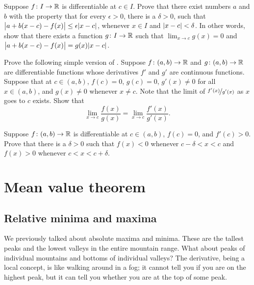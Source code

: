 \begin{exercise}
Suppose $f \colon I \to {\mathbb{R}}$ is differentiable at $c \in I$.
Prove that there exist numbers $a$ and $b$ with the property that
for every $\epsilon > 0$, there is a $\delta > 0$, such that
$\bigl\lvert {a+b(x-c) - f(x)} \bigr\rvert \leq \epsilon \lvert {x-c} \rvert$, whenever $x \in I$ and
$\lvert {x-c} \rvert < \delta$.
In other words, show that
there exists a function $g \colon I \to {\mathbb{R}}$
such that $\lim_{x\to c} g(x) = 0$ and
$\bigl\lvert {a+b(x-c) - f(x)} \bigr\rvert = g(x) \lvert {x-c} \rvert$.
\end{exercise}

\begin{exercise} \label{exercise:simpleLHopital}
Prove the following simple version of .
Suppose 
$f \colon (a,b) \to {\mathbb{R}}$ and $g \colon (a,b) \to {\mathbb{R}}$ are differentiable
functions
whose derivatives $f'$ and $g'$ are continuous functions.
Suppose that at $c \in (a,b)$, $f(c) = 0$, $g(c)=0$,
$g'(x) \neq 0$ for all $x \in (a,b)$, and
$g(x) \neq 0$ whenever $x \neq c$.   Note
that the limit of $\nicefrac{f'(x)}{g'(x)}$ as $x$ goes to $c$ exists.  Show that
\begin{equation*}
\lim_{x \to c} \frac{f(x)}{g(x)} = 
\lim_{x \to c} \frac{f'(x)}{g'(x)} .
\end{equation*}
\end{exercise}

\begin{exercise}
Suppose $f \colon (a,b) \to {\mathbb{R}}$ is differentiable at $c \in (a,b)$,
$f(c)=0$, and $f'(c) > 0$.
Prove that there is a $\delta > 0$ such that $f(x) < 0$
whenever $c-\delta < x < c$ and
$f(x) > 0$ 
whenever $c < x < c+\delta$.
\end{exercise}


\sectionnewpage
\section{Mean value theorem}
\label{sec:mvt}



\subsection{Relative minima and maxima}

We previously talked about absolute maxima and minima.  These are the tallest peaks and
the lowest valleys in the entire mountain range.  What
about peaks of individual mountains and bottoms of individual valleys?
The derivative, being a local concept, is like walking around in a fog; it
cannot tell you if you are on the highest peak, but it can tell you whether you are
at the top of some peak.

